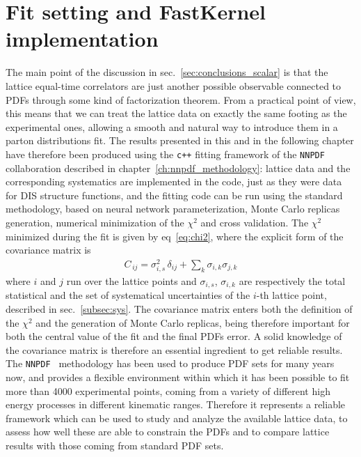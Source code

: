 \section{Fit setting and FastKernel implementation}
\label{sec:fk_qpdf}
The main point of the discussion in sec.~\ref{sec:conclusions_scalar} is that the lattice equal-time correlators 
are just another possible observable connected to PDFs through some kind of factorization theorem.
From a practical point of view, this means that we can treat the lattice data on
exactly the same footing as the experimental ones, allowing a smooth and natural
way to introduce them in a parton distributions fit. The results presented in this and in the following
chapter have therefore been produced using the {\tt c++} fitting framework of the {\tt NNPDF} collaboration
described in chapter~\ref{ch:nnpdf_methodology}: lattice data and the corresponding systematics
are implemented in the code, just as they were data for DIS structure functions, and the fitting code
can be run using the standard methodology, based on neural network parameterization, Monte Carlo replicas generation,
numerical minimization of the $\chi^2$ and cross validation.
The $\chi^2$ minimized during the fit is given by eq~\eqref{eq:chi2}, where the explicit form of the 
covariance matrix is
\begin{align}
	\label{eq:covariance}
    C_{\,ij} = \sigma_{i,s}^2\, \delta_{ij} + \sum_k \sigma_{i,k} \sigma_{j,k} 
\end{align}
where $i$ and $j$ run over the lattice points and $\sigma_{i,s}$, $\sigma_{i,k}$ 
are respectively the total statistical and the set of  systematical uncertainties
of the $i$-th lattice point, described in sec.~\ref{subsec:sys}.
The covariance matrix enters both the definition of the $\chi^2$  
and the generation of Monte Carlo replicas,
being therefore important for both the central value of the fit and the final PDFs error. A solid knowledge 
of the covariance matrix is therefore an essential ingredient to get reliable results.
The {\tt NNPDF } methodology has been used to produce PDF sets for many years now, and provides a flexible environment
within which it has been possible to fit more than 4000 experimental points, coming from a variety 
of different high energy processes in different kinematic ranges.
Therefore it represents a reliable framework which can be used to study and analyze the available lattice data, to assess
how well these are able to constrain the PDFs and to compare lattice results with those coming from standard PDF sets.

